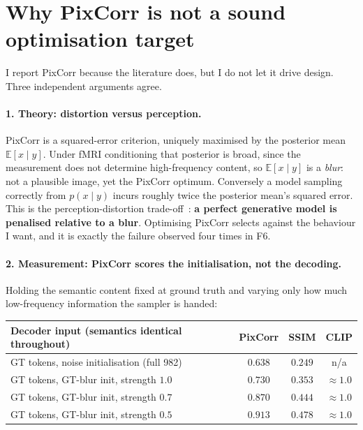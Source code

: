 \documentclass[11pt,a4paper]{article}
\newcommand{\E}{\mathbb{E}}
\theoremstyle{plain}
\theoremstyle{remark}
\begin{document}
\section{Why PixCorr is not a sound optimisation target}
\label{sec:pixcorr}

I report PixCorr because the literature does, but I do not let it drive design.
Three independent arguments agree.

\paragraph{1. Theory: distortion versus perception.}
PixCorr is a squared-error criterion, uniquely maximised by the posterior mean
$\E[x\mid y]$. Under fMRI conditioning that posterior is broad, since the
measurement does not determine high-frequency content, so $\E[x\mid y]$ is a
\emph{blur}: not a plausible image, yet the PixCorr optimum. Conversely a model
sampling correctly from $p(x\mid y)$ incurs roughly twice the posterior mean's
squared error. This is the perception-distortion
trade-off~\cite{blau2018perception}: \textbf{a perfect generative model is
penalised relative to a blur}. Optimising PixCorr selects against the behaviour I
want, and it is exactly the failure observed four times in F6.

\paragraph{2. Measurement: PixCorr scores the initialisation, not the decoding.}
Holding the semantic content fixed at ground truth and varying only how much
low-frequency information the sampler is handed:

\begin{center}
\footnotesize
\begin{tabular}{@{}lccc@{}}
\toprule
\textbf{Decoder input (semantics identical throughout)} & \textbf{PixCorr} & \textbf{SSIM} & \textbf{CLIP} \\
\midrule
GT tokens, noise initialisation (full 982)  & $0.638$ & $0.249$ & n/a \\
GT tokens, GT-blur init, strength $1.0$     & $0.730$ & $0.353$ & $\approx1.0$ \\
GT tokens, GT-blur init, strength $0.7$     & $0.870$ & $0.444$ & $\approx1.0$ \\
GT tokens, GT-blur init, strength $0.5$     & $0.913$ & $0.478$ & $\approx1.0$ \\
\bottomrule
\end{tabular}
\end{center}
\end{document}

